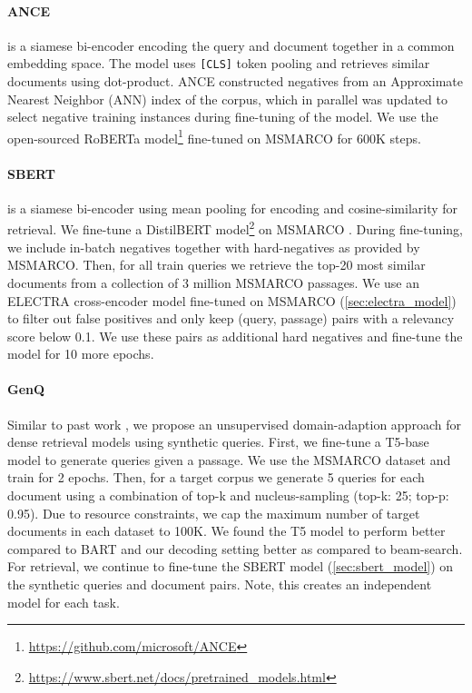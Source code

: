 \documentclass[11pt]{article}
\begin{document}
\paragraph{ANCE} \cite{xiong2020approximate} is a siamese bi-encoder encoding the query and document together in a common embedding space. The model uses \texttt{[CLS]} token pooling and retrieves similar documents using dot-product. ANCE constructed negatives from an Approximate Nearest Neighbor (ANN) index of the corpus, which in parallel was updated to select negative training instances during fine-tuning of the model. We use the open-sourced RoBERTa \cite{liu2019roberta} model\footnote{\href{https://github.com/microsoft/ANCE}{https://github.com/microsoft/ANCE}} fine-tuned on MSMARCO \cite{nguyen2016ms} for 600K steps.

\paragraph{SBERT}\label{sec:sbert_model} \cite{reimers-gurevych-2019-sentence} is a siamese bi-encoder using mean pooling for encoding and cosine-similarity for retrieval. We fine-tune a DistilBERT \cite{sanh2020distilbert} model\footnote{\href{https://www.sbert.net/docs/pretrained_models.html}{https://www.sbert.net/docs/pretrained\_models.html}} on MSMARCO \cite{nguyen2016ms}. During fine-tuning, we include in-batch negatives \cite{gillick2018endtoend} together with hard-negatives as provided by MSMARCO. Then, for all train queries we retrieve the top-20 most similar documents from a collection of 3 million MSMARCO passages. We use an ELECTRA \cite{Clark2020ELECTRA} cross-encoder model fine-tuned on MSMARCO (\autoref{sec:electra_model}) to filter out false positives and only keep (query, passage) pairs with a relevancy score below 0.1. We use these pairs as additional hard negatives and fine-tune the model for 10 more epochs.

\paragraph{GenQ} Similar to past work \cite{liang2020embeddingbased,ma2021zeroshot}, we propose an unsupervised domain-adaption approach for dense retrieval models using synthetic queries. First, we fine-tune a T5-base \cite{JMLR:v21:20-074} model to generate queries given a passage. We use the MSMARCO dataset and train for 2 epochs. Then, for a target corpus we generate 5 queries for each document using a combination of top-k and nucleus-sampling (top-k: 25; top-p: 0.95). Due to resource constraints, we cap the maximum number of target documents in each dataset to 100K. We found the T5 model to perform better compared to BART \cite{lewis-etal-2020-bart} and our decoding setting better as compared to beam-search. For retrieval, we continue to fine-tune the SBERT model (\autoref{sec:sbert_model}) on the synthetic queries and document pairs. Note, this creates an independent model for each task.
\end{document}
